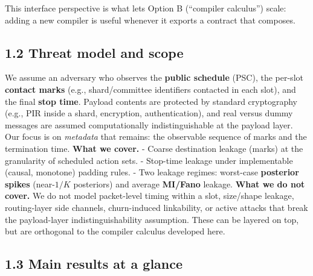 \documentclass[11pt]{article}
\begin{document}
This interface perspective is what lets Option B (``compiler calculus'')
scale: adding a new compiler is useful whenever it exports a contract
that composes.

\hypertarget{threat-model-and-scope}{%
\subsection{1.2 Threat model and scope}\label{threat-model-and-scope}}

We assume an adversary who observes the \textbf{public schedule} (PSC),
the per-slot \textbf{contact marks} (e.g., shard/committee identifiers
contacted in each slot), and the final \textbf{stop time}. Payload
contents are protected by standard cryptography (e.g., PIR inside a
shard, encryption, authentication), and real versus dummy messages are
assumed computationally indistinguishable at the payload layer. Our
focus is on \emph{metadata} that remains: the observable sequence of
marks and the termination time. \textbf{What we cover.} - Coarse
destination leakage (marks) at the granularity of scheduled action sets.
- Stop-time leakage under implementable (causal, monotone) padding
rules. - Two leakage regimes: worst-case \textbf{posterior spikes}
(near-\(1/K\) posteriors) and average \textbf{MI/Fano} leakage.
\textbf{What we do not cover.} We do not model packet-level timing
within a slot, size/shape leakage, routing-layer side channels,
churn-induced linkability, or active attacks that break the
payload-layer indistinguishability assumption. These can be layered on
top, but are orthogonal to the compiler calculus developed here.

\hypertarget{main-results-at-a-glance}{%
\subsection{1.3 Main results at a
glance}\label{main-results-at-a-glance}}
\end{document}
